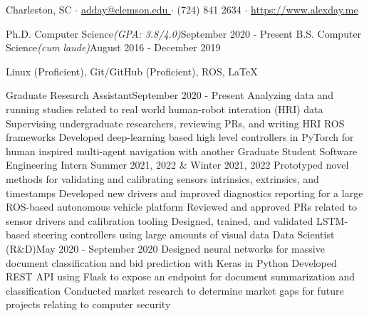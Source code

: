 \documentclass[letter]{article}
\begin{document}
    
    \vspace*{-40pt}

     {Charleston, SC $\cdot$ \href{mailto://adday@clemson.edu}{\underline{adday@clemson.edu }} $\cdot$ (724) 841 2634 $\cdot$ \href{https://www.alexday.me} {\underline{https://www.alexday.me}}}

         {Ph.D. Computer Science}{\textit{(GPA: 3.8/4.0)}}{September 2020 - Present}
        \vspace{\interspace}
         {B.S. Computer Science}{\textit{(cum laude)}}{August 2016 - December 2019}
        \vspace{\interspace}
    \vspace{-\interspace}



           {Linux (Proficient), Git/GitHub (Proficient), ROS, \LaTeX} 


        {Graduate Research Assistant}{September 2020 - Present}
        {Analyzing data and running studies related to real world human-robot interation (HRI) data}
        {Supervising undergraduate researchers, reviewing PRs, and writing HRI ROS frameworks}
        {Developed deep-learning based high level controllers in PyTorch for human inspired multi-agent navigation with another Graduate Student}
    \vspace{\interspace}
        {Software Engineering Intern}
        {Summer 2021, 2022 \& Winter 2021, 2022}
        {Prototyped novel methods for validating and calibrating sensors intrinsics, extrinsics, and timestamps}
        {Developed new drivers and improved diagnostics reporting for a large ROS-based autonomous vehicle platform}
        {Reviewed and approved PRs related to sensor drivers and calibration tooling}
        {Designed, trained, and validated LSTM-based steering controllers using large amounts of visual data}
    \vspace{\interspace}
        {Data Scientist (R\&D)}{May 2020 - September 2020}
        {Designed neural networks for massive document classification and bid prediction with Keras in Python}
        {Developed REST API using Flask to expose an endpoint for document summarization and classification}
        {Conducted market research to determine market gaps for future projects relating to computer security}
\end{document}
